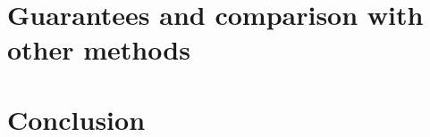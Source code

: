 \documentclass[11pt,a4paper,oldfontcommands,openany]{memoir}
\begin{document}
    \section{Guarantees and comparison with other methods}

    
    \section{Conclusion}





\end{document}
